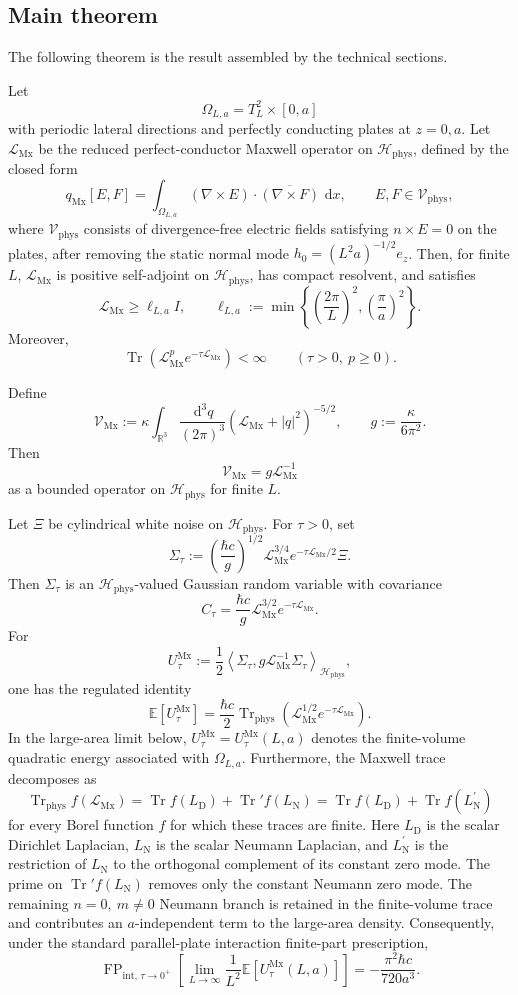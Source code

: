 \documentclass[11pt]{article}
\providecommand{\R}{\mathbb{R}}
\providecommand{\dd}{\,\mathrm{d}}
\providecommand{\hbarc}{\hbar c}
\providecommand{\E}{\mathbb{E}}
\providecommand{\Tr}{\operatorname{Tr}}
\providecommand{\Trphys}{\operatorname{Tr}_{\mathrm{phys}}}
\providecommand{\FP}{\operatorname{FP}}
\providecommand{\abs}[1]{\left\lvert #1\right\rvert}
\providecommand{\inner}[2]{\left\langle #1,#2\right\rangle}
\providecommand{\set}[1]{\left\{#1\right\}}
\providecommand{\paren}[1]{\left(#1\right)}
\providecommand{\OmegaLa}{\Omega_{L,a}}
\providecommand{\TtwoL}{T_L^2}
\providecommand{\Hphys}{\mathcal H_{\mathrm{phys}}}
\providecommand{\Vphys}{\mathcal V_{\mathrm{phys}}}
\providecommand{\hzero}{h_0}
\providecommand{\qMx}{q_{\mathrm{Mx}}}
\providecommand{\LMx}{\mathcal L_{\mathrm{Mx}}}
\providecommand{\VMx}{\mathcal V_{\mathrm{Mx}}}
\providecommand{\LD}{L_{\mathrm D}}
\providecommand{\LN}{L_{\mathrm N}}
\providecommand{\LNp}{L_{\mathrm N}^{\prime}}
\providecommand{\XiNoise}{\Xi}
\providecommand{\Sigmatau}{\Sigma_{\tau}}
\providecommand{\Ctau}{C_{\tau}}
\providecommand{\UtauMx}{U_{\tau}^{\mathrm{Mx}}}
\numberwithin{equation}{section}
\begin{document}
\subsection{Main theorem}
\label{subsec:main-theorem}

The following theorem is the result assembled by the technical sections.

\begin{theorem}
\label{thm:main-maxwell-representation}
Let
\[
    \OmegaLa=\TtwoL\times[0,a]
\]
with periodic lateral directions and perfectly conducting plates at
\(z=0,a\).  Let \(\LMx\) be the reduced perfect-conductor Maxwell operator on
\(\Hphys\), defined by the closed form
\[
    \qMx[E,F]
    =
    \int_{\OmegaLa}
    (\nabla\times E)\cdot\overline{(\nabla\times F)}\,\dd x,
    \qquad E,F\in\Vphys,
\]
where \(\Vphys\) consists of divergence-free electric fields satisfying
\(n\times E=0\) on the plates, after removing the static normal mode
\(\hzero=(L^2a)^{-1/2}e_z\).  Then, for finite \(L\), \(\LMx\) is positive
self-adjoint on \(\Hphys\), has compact resolvent, and satisfies
\[
    \LMx\geq
    \ell_{L,a}I,
    \qquad
    \ell_{L,a}:=
    \min\set{\paren{\frac{2\pi}{L}}^2,
              \paren{\frac{\pi}{a}}^2}.
\]
Moreover,
\[
    \Tr\paren{\LMx^p e^{-\tau\LMx}}<\infty
    \qquad(\tau>0,\ p\geq0).
\]

Define
\[
    \VMx
    :=
    \kappa
    \int_{\R^3}\frac{\dd^3q}{(2\pi)^3}
    (\LMx+\abs q^2)^{-5/2},
    \qquad
    g:=\frac{\kappa}{6\pi^2} .
\]
Then
\[
    \VMx=g\LMx^{-1}
\]
as a bounded operator on \(\Hphys\) for finite \(L\).

Let \(\XiNoise\) be cylindrical white noise on \(\Hphys\).  For \(\tau>0\), set
\[
    \Sigmatau
    :=
    \paren{\frac{\hbarc}{g}}^{1/2}
    \LMx^{3/4}e^{-\tau\LMx/2}\XiNoise .
\]
Then \(\Sigmatau\) is an \(\Hphys\)-valued Gaussian random variable with
covariance
\[
    \Ctau
    =
    \frac{\hbarc}{g}\LMx^{3/2}e^{-\tau\LMx} .
\]
For
\[
    \UtauMx
    :=
    \frac12\inner{\Sigmatau}{g\LMx^{-1}\Sigmatau}_{\Hphys},
\]
one has the regulated identity
\[
    \E[\UtauMx]
    =
    \frac{\hbarc}{2}
    \Trphys\paren{\LMx^{1/2}e^{-\tau\LMx}} .
\]
In the large-area limit below, \(\UtauMx=\UtauMx(L,a)\) denotes the
finite-volume quadratic energy associated with \(\Omega_{L,a}\).
Furthermore, the Maxwell trace decomposes as
\[
    \Trphys f(\LMx)=\Tr f(\LD)+\Tr' f(\LN)
    =\Tr f(\LD)+\Tr f(\LNp)
\]
for every Borel function \(f\) for which these traces are finite.  Here
\(\LD\) is the scalar Dirichlet Laplacian, \(\LN\) is the scalar Neumann
Laplacian, and \(\LNp\) is the restriction of \(\LN\) to the orthogonal
complement of its constant zero mode.  The prime on \(\Tr' f(\LN)\) removes
only the constant Neumann zero mode.  The remaining \(n=0,\ m\ne0\) Neumann
branch is retained in the finite-volume trace and contributes an
\(a\)-independent term to the large-area density.  Consequently, under the standard
parallel-plate interaction finite-part prescription,
\[
    \boxed{
    \FP_{\mathrm{int},\,\tau\to0^+}
    \left[
        \lim_{L\to\infty}\frac{1}{L^2}\E[\UtauMx(L,a)]
    \right]
    =
    -\frac{\pi^2\hbarc}{720a^3} .
    }
\]
\end{theorem}
\end{document}
